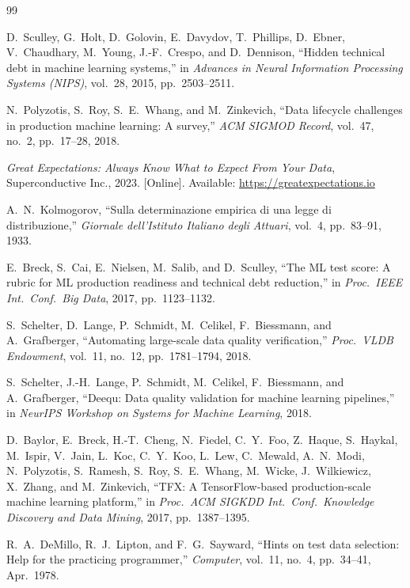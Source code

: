 \documentclass[journal]{IEEEtran}
\begin{document}
\begin{thebibliography}{99}

D.~Sculley, G.~Holt, D.~Golovin, E.~Davydov, T.~Phillips, D.~Ebner,
V.~Chaudhary, M.~Young, J.-F.~Crespo, and D.~Dennison,
``Hidden technical debt in machine learning systems,''
in \emph{Advances in Neural Information Processing Systems (NIPS)},
vol.~28, 2015, pp.~2503--2511.

N.~Polyzotis, S.~Roy, S.~E.~Whang, and M.~Zinkevich,
``Data lifecycle challenges in production machine learning: A survey,''
\emph{ACM SIGMOD Record}, vol.~47, no.~2, pp.~17--28, 2018.

\emph{Great Expectations: Always Know What to Expect From Your Data},
Superconductive Inc., 2023. [Online].
Available: \url{https://greatexpectations.io}

A.~N.~Kolmogorov,
``Sulla determinazione empirica di una legge di distribuzione,''
\emph{Giornale dell'Istituto Italiano degli Attuari}, vol.~4,
pp.~83--91, 1933.

E.~Breck, S.~Cai, E.~Nielsen, M.~Salib, and D.~Sculley,
``The ML test score: A rubric for ML production readiness and
technical debt reduction,''
in \emph{Proc.\ IEEE Int.\ Conf.\ Big Data}, 2017, pp.~1123--1132.

S.~Schelter, D.~Lange, P.~Schmidt, M.~Celikel, F.~Biessmann,
and A.~Grafberger,
``Automating large-scale data quality verification,''
\emph{Proc.\ VLDB Endowment}, vol.~11, no.~12, pp.~1781--1794, 2018.

S.~Schelter, J.-H.~Lange, P.~Schmidt, M.~Celikel, F.~Biessmann,
and A.~Grafberger,
``Deequ: Data quality validation for machine learning pipelines,''
in \emph{NeurIPS Workshop on Systems for Machine Learning}, 2018.

D.~Baylor, E.~Breck, H.-T.~Cheng, N.~Fiedel, C.~Y.~Foo, Z.~Haque,
S.~Haykal, M.~Ispir, V.~Jain, L.~Koc, C.~Y.~Koo, L.~Lew, C.~Mewald,
A.~N.~Modi, N.~Polyzotis, S.~Ramesh, S.~Roy, S.~E.~Whang, M.~Wicke,
J.~Wilkiewicz, X.~Zhang, and M.~Zinkevich,
``TFX: A TensorFlow-based production-scale machine learning platform,''
in \emph{Proc.\ ACM SIGKDD Int.\ Conf.\ Knowledge Discovery and
Data Mining}, 2017, pp.~1387--1395.

R.~A.~DeMillo, R.~J.~Lipton, and F.~G.~Sayward,
``Hints on test data selection: Help for the practicing programmer,''
\emph{Computer}, vol.~11, no.~4, pp.~34--41, Apr.\ 1978.


\end{thebibliography}
\end{document}
